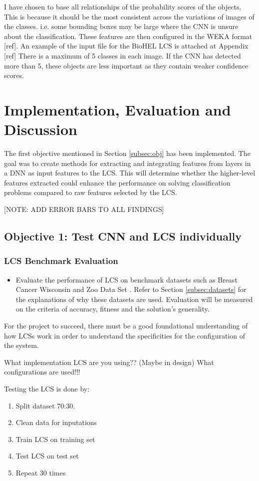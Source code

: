 I have chosen to base all relationships of the probability scores of the objects. This is because it should be the most consistent across the variations of images of the classes. i.e. some bounding boxes may be large where the CNN is unsure about the classification. These features are then configured in the WEKA format [ref]. An example of the input file for the BioHEL LCS is attached at Appendix [ref]
There is a maximum of 5 classes in each image. If the CNN has detected more than 5, these objects are less important as they contain weaker confidence scores. 


\chapter{Implementation, Evaluation and Discussion}
The first objective mentioned in Section \ref{subsec:obj} has been implemented. The goal was to create methods for extracting and integrating features from layers in a DNN as input features to the LCS. This will determine whether the higher-level features extracted could enhance the performance on solving classification problems compared to raw features selected by the LCS. 

[NOTE: ADD ERROR BARS TO ALL FINDINGS]
\section{Objective 1: Test CNN and LCS individually}
\subsection{LCS Benchmark Evaluation} \label{subsec:bench}
\begin{itemize}
	\item Evaluate the performance of LCS on benchmark datasets such as Breast Cancer
	Wisconsin \cite{wisconsinbreast} and Zoo Data Set \cite{zoodata}. Refer to Section \ref{subsec:datasets} for the explanations of why these datasets are used. Evaluation will be measured on the criteria of
	accuracy, fitness and the solution’s generality.
\end{itemize}

For the project to succeed, there must be a good foundational understanding of how LCSs work in order to understand the specificities for the configuration of the system. 

What implementation LCS are you using?? (Maybe in design)
What configurations are used!!!

Testing the LCS is done by:
\begin{enumerate}
	\item Split dataset 70:30. 
	\item Clean data for inputations
	\item Train LCS on training set
	\item Test LCS on test set
	\item Repeat 30 times
\end{enumerate}

